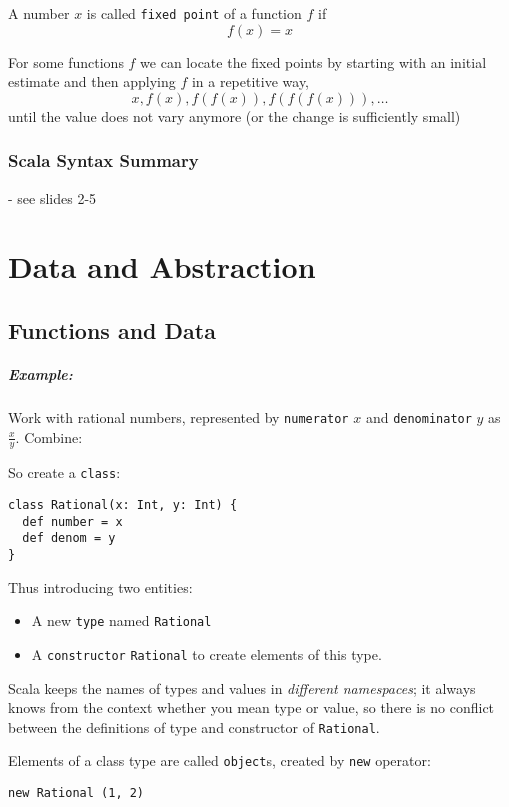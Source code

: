 \documentclass{scrartcl}
\newcommand{\example}{\subparagraph{Example:}} %
\newcommand{\term}[1]{\verb~#1~} %
\begin{document}
A number $x$ is called \term{fixed point} of a function $f$ if
$$f(x) = x$$

For some functions $f$ we can locate the fixed points by starting with an
initial estimate and then applying $f$ in a repetitive way,
$$x, f(x), f(f(x)), f(f(f(x))), \dots$$
until the value does not vary anymore (or the change is sufficiently small)

\subsubsection{Scala Syntax Summary}
\label{sec:SyntaxSummary}

- see slides 2-5

\section{Data and Abstraction}
\label{sec:DataAndAbstraction}
\subsection{Functions and Data}
\label{sec:FunctionsAndData}

\example Work with rational numbers, represented by \term{numerator} $x$ and
\term{denominator} $y$ as $\frac xy$. Combine:

So create a \lstinline{class}:
\begin{lstlisting}
class Rational(x: Int, y: Int) {
  def number = x
  def denom = y
}
\end{lstlisting}

Thus introducing two entities:
\begin{itemize}
\item A new \term{type} named \lstinline{Rational}
\item A \term{constructor} \lstinline|Rational| to create elements of this type.
\end{itemize}

Scala keeps the names of types and values in {\it different namespaces}; it
always knows from the context whether you mean type or value, so there is no
conflict between the definitions of type and constructor of
\lstinline{Rational}.

Elements of a class type are called
\lstinline{object}s, created by \lstinline{new} operator:

\begin{lstlisting}
new Rational (1, 2)
\end{lstlisting}
\end{document}
